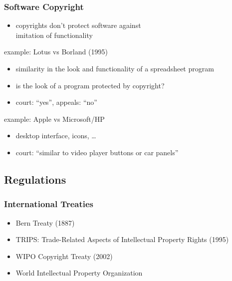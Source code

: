 \documentclass[dvipsnames]{beamer}
\theoremstyle{plain}
\begin{document}
\begin{frame}
  \frametitle{Software Copyright}

  \begin{itemize}
    \item copyrights don't protect software against\\
      imitation of functionality
  \end{itemize}

  \begin{exampleblock}{example: Lotus vs Borland (1995)}
    \begin{itemize}
      \item similarity in the look and functionality of a spreadsheet program
      \item is the look of a program protected by copyright?
      \item court: ``yes'', appeals: ``no''
    \end{itemize}
  \end{exampleblock}

  \pause
  \begin{exampleblock}{example: Apple vs Microsoft/HP}
    \begin{itemize}
      \item desktop interface, icons, \ldots
      \item court: ``similar to video player buttons or car panels''
    \end{itemize}
  \end{exampleblock}
\end{frame}

\subsection{Regulations}

\begin{frame}
  \frametitle{International Treaties}

  \begin{itemize}
    \item Bern Treaty (1887)
    \item TRIPS: Trade-Related Aspects of Intellectual Property Rights (1995)

    \medskip
    \item WIPO Copyright Treaty (2002)
    \item World Intellectual Property Organization
  \end{itemize}
\end{frame}
\end{document}
